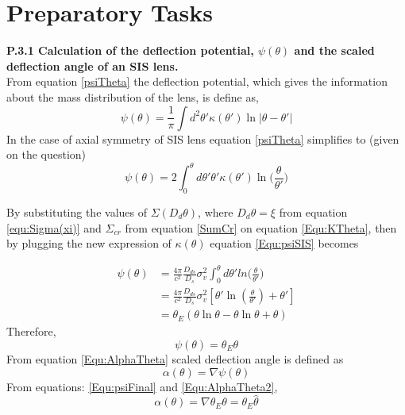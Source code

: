 \section{Preparatory Tasks}
\textbf{ P.3.1 Calculation of the deflection potential, $\psi(\theta) $ and the scaled deflection angle of an SIS lens.}\\
 
 \noindent
 From equation \ref{psiTheta} the deflection potential, which gives the information about the mass distribution of the lens, is define as,
 \begin{equation}
 \psi(\theta)=\frac{1}{\pi}\int d^2\theta'\kappa(\theta')\ln |\theta-\theta'| 
 \end{equation}
 In the case of axial symmetry of SIS lens equation \ref{psiTheta} simplifies to (given on the question)
 \begin{equation}
 \psi(\theta)=2\int_{0}^{\theta}d\theta' \theta'\kappa(\theta') \ln \bigg(\frac{\theta}{\theta'}\bigg)
 \label{Equ:psiSIS}
 \end{equation}

 By substituting the values of $ \Sigma(D_{d}\theta) $, where $ D_{d}\theta=\xi $ from equation \ref{equ:Sigma(xi)} and  $ \Sigma_{cr} $ from equation \ref{SumCr} on equation \ref{Equ:KTheta}, then by plugging the new expression of  $ \kappa(\theta) $ equation \ref{Equ:psiSIS} becomes
 
 
 \begin{align*}
	 \psi(\theta)&=\frac{4\pi}{c^2}\frac{D_{ds}}{D_{s}}\sigma^2_{v}\int_{0}^{\theta}d\theta' ln \bigg(\frac{\theta}{\theta'}\bigg) \\
					 &=\frac{4\pi}{c^2}\frac{D_{ds}}{D_{s}}\sigma^2_{v} \left[\theta' \ln(\frac{\theta}{\theta'})+\theta'\right] \\
					 &=\theta_{E}(\theta \ln \theta - \theta \ln \theta + \theta )
 \end{align*}
 Therefore, 
 \begin{equation}
 \psi(\theta)=\theta_{E}\theta 
 \label{Equ:psiFinal}
 \end{equation}
 From equation \ref{Equ:AlphaTheta} scaled deflection angle is defined as
 \begin{equation}
 \alpha(\theta)=\nabla\psi(\theta)
 \label{Equ:AlphaTheta2}
 \end{equation}
 From equations: \ref{Equ:psiFinal} and \ref{Equ:AlphaTheta2},
 \begin{equation}
 \alpha(\theta)=\nabla \theta_{E}\theta = \theta_{E}\hat{\theta}
 \label{Equ:AlphaThetaFinal}
 \end{equation}
 \\
 
